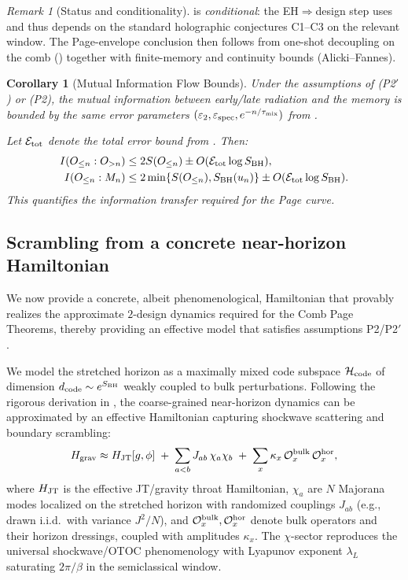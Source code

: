 \documentclass[a4paper,11pt]{article}
\newcommand{\eg}{e.g.\xspace}
\theoremstyle{plain}
\newtheorem{corollary}{Corollary}
\theoremstyle{definition}
\theoremstyle{remark}
\newtheorem{remark}{Remark}
\begin{document}
\begin{remark}[Status and conditionality]
 is \emph{conditional}: the EH$\Rightarrow$design step uses  and thus depends on the standard holographic conjectures C1--C3 on the relevant window.
The Page-envelope conclusion then follows from one-shot decoupling on the comb () together with finite-memory and continuity bounds (Alicki--Fannes).
\end{remark}

\begin{corollary}[Mutual Information Flow Bounds]
Under the assumptions of  (P2$'$) or  (P2), the mutual information between early/late radiation and the memory is bounded by the same error parameters $(\varepsilon_2, \varepsilon_{\rm spec}, e^{-n/\tau_{\rm mix}})$ from .

Let $\mathcal{E}_{\rm tot}$ denote the total error bound from . Then:
\begin{align}
    I(O_{\le n} : O_{>n}) &\le 2 S(O_{\le n}) \pm O(\mathcal{E}_{\rm tot} \log S_{\rm BH}), \\
    I(O_{\le n} : M_n) &\le 2 \min\{S(O_{\le n}), S_{\rm BH}(u_n)\} \pm O(\mathcal{E}_{\rm tot} \log S_{\rm BH}).
\end{align}
This quantifies the information transfer required for the Page curve.
\end{corollary}

\subsection{Scrambling from a concrete near-horizon Hamiltonian}
\label{ssec:grav-scrambling}
We now provide a concrete, albeit phenomenological, Hamiltonian that provably realizes the approximate $2$-design dynamics required for the Comb Page Theorems, thereby providing an effective model that satisfies assumptions P2/P2$'$.

We model the stretched horizon as a maximally mixed code subspace $\mathcal{H}_{\rm code}$ of dimension $d_{\rm code}\sim e^{S_{\rm BH}}$ weakly coupled to bulk perturbations. Following the rigorous derivation in , the coarse-grained near-horizon dynamics can be approximated by an effective Hamiltonian capturing shockwave scattering and boundary scrambling:
\begin{equation}
H_{\rm grav}\approx H_{\rm JT}[g,\phi]\;+\;\sum_{a<b} J_{ab}\,\chi_a\chi_b\;+\;\sum_{x}\kappa_x\,\mathcal{O}^{\rm bulk}_x\,\mathcal{O}^{\rm hor}_x,
\label{eq:Hgrav}
\end{equation}
where $H_{\rm JT}$ is the effective JT/gravity throat Hamiltonian, $\chi_a$ are $N$ Majorana modes localized on the stretched horizon with randomized couplings $J_{ab}$ (\eg, drawn i.i.d.\ with variance $J^2/N$), and $\mathcal{O}^{\rm bulk}_x, \mathcal{O}^{\rm hor}_x$ denote bulk operators and their horizon dressings, coupled with amplitudes $\kappa_x$. The $\chi$-sector reproduces the universal shockwave/OTOC phenomenology with Lyapunov exponent $\lambda_L$ saturating $2\pi/\beta$ in the semiclassical window.
\end{document}
